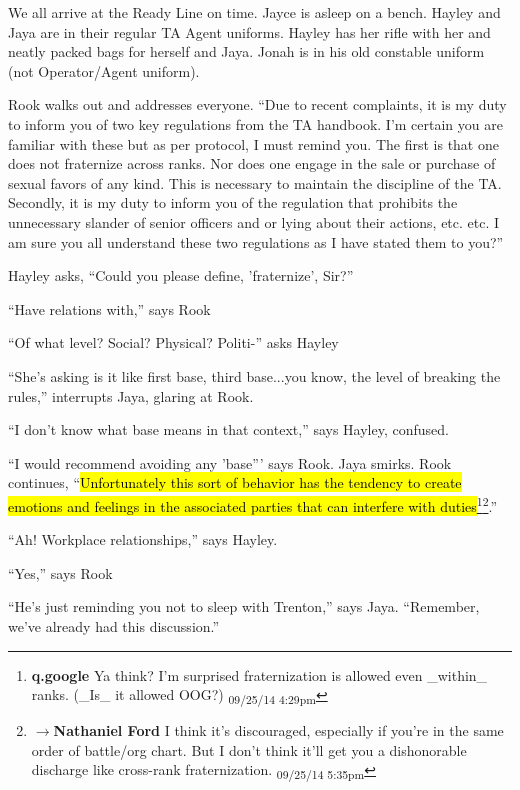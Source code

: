 We all arrive at the Ready Line on time.  Jayce is asleep on a bench.  Hayley and Jaya are in their regular TA Agent uniforms.  Hayley has her rifle with her and neatly packed bags for herself and Jaya.  Jonah is in his old constable uniform (not Operator/Agent uniform).  



Rook walks out and addresses everyone.  ``Due to recent complaints, it is my duty to inform you of two key regulations from the TA handbook.  I'm certain you are familiar with these but as per protocol, I must remind you.  The first is that one does not fraternize across ranks.  Nor does one engage in the sale or purchase of sexual favors of any kind.  This is necessary to maintain the discipline of the TA. Secondly, it is my duty to inform you of the regulation that prohibits the unnecessary slander of senior officers and or lying about their actions, etc. etc.  I am sure you all understand these two regulations as I have stated them to you?''

Hayley asks, ``Could you please define, 'fraternize', Sir?''

``Have relations with,'' says Rook

``Of what level? Social?  Physical?  Politi-'' asks Hayley

``She's asking is it like first base, third base...you know, the level of breaking the rules,'' interrupts Jaya, glaring at Rook.

``I don't know what base means in that context,'' says Hayley, confused.

``I would recommend avoiding any 'base''' says Rook.  Jaya smirks.  Rook continues, ``\hl{Unfortunately this sort of behavior has the tendency to create emotions and feelings in the associated parties that can interfere with duties}\footnote{\textbf{q.google }Ya think?  I'm surprised fraternization is allowed even \_within\_ ranks.  (\_Is\_ it allowed OOG?) \textsubscript{09/25/14 4:29pm}}\footnote{$\rightarrow$\textbf{Nathaniel Ford }I think it's discouraged, especially if you're in the same order of battle/org chart. But I don't think it'll get you a dishonorable discharge like cross-rank fraternization. \textsubscript{09/25/14 5:35pm}}.''

``Ah!  Workplace relationships,'' says Hayley.

``Yes,'' says Rook

``He's just reminding you not to sleep with Trenton,'' says Jaya.  ``Remember, we've already had this discussion.''

